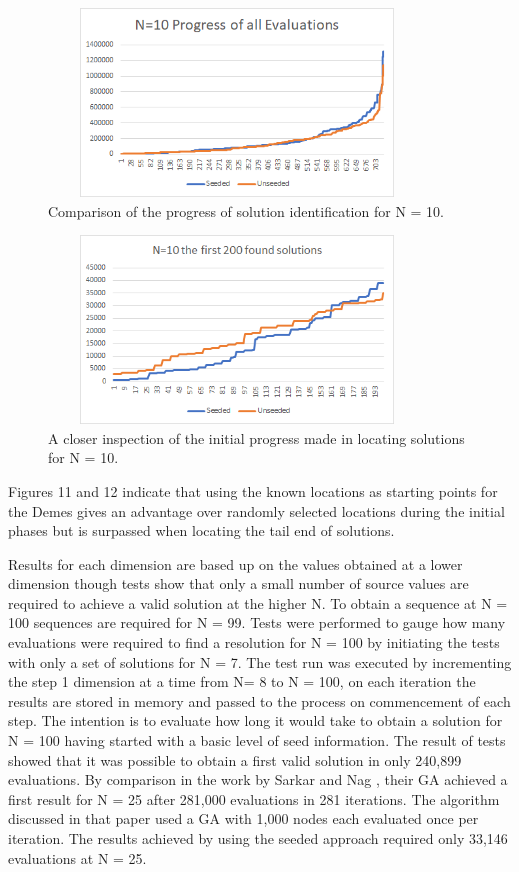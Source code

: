 \documentclass[conference]{IEEEtran}
\begin{document}
\begin{figure}[!htbp]
	\centering	
	\includegraphics[width=10cm, height=5cm]{N10AllEvaluations}
	\caption{Comparison of the progress of solution identification for N = 10.}
\end{figure}

\begin{figure}[!htbp]
	\centering	
	\includegraphics[width=10cm, height=5cm]{First200Progress}
	\caption{A closer inspection of the initial progress made in locating solutions for N = 10.}
\end{figure}

Figures 11 and 12 indicate that using the known locations as starting points for the Demes gives an advantage over randomly selected locations during the initial phases but is surpassed when locating the tail end of solutions. 

Results for each dimension are based up on the values obtained at a lower dimension though tests show that only a small number of source values are required to achieve a valid solution at the higher N. To obtain a sequence at N = 100 sequences are required for N = 99. Tests were performed to gauge how many evaluations were required to find a resolution for N = 100 by initiating the tests with only a set of solutions for N = 7. The test run was executed by incrementing the step 1 dimension at a time from N= 8 to N = 100, on each iteration the results are stored in memory and passed to the process on commencement of each step. The intention is to evaluate how long it would take to obtain a solution for N = 100 having started with a basic level of seed information. The result of tests showed that it was possible to obtain a first valid solution in only 240,899 evaluations. By comparison in the work by Sarkar and Nag \cite{Adaptive}, their GA achieved a first result for N = 25 after 281,000 evaluations in 281 iterations. The algorithm discussed in that paper used a GA with 1,000 nodes each evaluated once per iteration. The results achieved by using the seeded approach required only 33,146 evaluations at N = 25.
\end{document}

